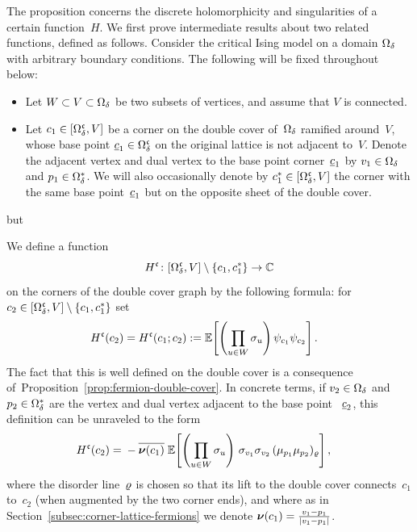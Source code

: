 \documentclass[12pt,oneside,english]{amsart}
\numberwithin{equation}{section}
\numberwithin{figure}{section}
\theoremstyle{plain}
\theoremstyle{plain}
\theoremstyle{plain}
\theoremstyle{plain}
\theoremstyle{remark}
\theoremstyle{definition}
\theoremstyle{plain}
\theoremstyle{plain}
\numberwithin{thm}{section}
\begin{document}
The proposition concerns the discrete holomorphicity and singularities of a 
certain function~$H$. We first prove intermediate results about two 
related functions, defined as follows. Consider the critical Ising model
on a domain ${{\Omega}}_{{\delta}} $ with arbitrary boundary conditions.
The following will be fixed throughout below:
\begin{itemize}
\item Let $W \subset V \subset {{\Omega}}_{{\delta}}$ be two subsets of vertices,
and assume that $V$ is connected.
\item Let $c_1 \in {\left[ {{\Omega}}_{{\delta}}^{\mathfrak{c}}, V \right]}$ be a corner on the double cover 
of~${{\Omega}}_{{\delta}}$ ramified around~$V$, whose base point
$\underline{c}_1 \in {{\Omega}}_{{\delta}}^{\mathfrak{c}}$ on the original lattice is not adjacent 
to~$V$. 
Denote the adjacent vertex and dual vertex to the base 
point corner~$\underline{c}_1$ by
$v_1 \in {{\Omega}}_{{\delta}}$ and $p_1 \in {{\Omega}}_{{\delta}}^*$.
We will also occasionally denote by
$c_1^* \in {\left[ {{\Omega}}_{{\delta}}^{\mathfrak{c}}, V \right]}$ the corner with the same base 
point~$\underline{c}_1$ but on the opposite sheet of the 
double cover.
\end{itemize}
but 

We define a function
\[ H^{\mathfrak{c}} \colon {\left[ {{\Omega}}_{{\delta}}^{\mathfrak{c}}, V \right]} \setminus \left\{ c_1, c_1^* \right\} \to  \mathbb{C} 
\]
on the corners of the double cover graph by the following formula: for
$c_2 \in {\left[ {{\Omega}}_{{\delta}}^{\mathfrak{c}}, V \right]} \setminus \left\{ c_1, c_1^* \right\}$ set
\begin{align}\label{eq: def of H on corners}
H^{\mathfrak{c}} ( c_{2} ) = H^{\mathfrak{c}} ( c_{1} ; c_{2} )
:= \; & \mathbb{E} \! \left[ { \left(
    \prod_{u \in W} {\sigma}_{u} \right)
    {\psi}_{c_{1}} {\psi}_{c_{2}} } \right] .
\end{align}
The fact that this is well defined on the double cover is a consequence 
of~Proposition~\ref{prop:fermion-double-cover}. In concrete terms, if
$v_2 \in {{\Omega}}_{{\delta}}$ and $p_2 \in {{\Omega}}_{{\delta}}^*$ are the vertex and dual vertex 
adjacent to the base point ~$\underline{c}_2$, this definition can be 
unraveled to the form
\begin{align*}
H^{\mathfrak{c}} ( c_{2} ) = \; & - \overline{\boldsymbol{\nu}(c_1)} \; \mathbb{E} \! \left[ { \left(
    \prod_{u \in W} {\sigma}_{u} \right) \, {\sigma}_{v_1} {\sigma}_{v_2} \,
    ({\mu}_{p_1}{\mu}_{p_2})_{{\varrho}}  } \right] ,
\end{align*}
where the disorder line~${\varrho}$ is 
chosen so that its lift to the double cover connects~$c_1$ to~$c_2$
(when augmented by the two corner ends), and where 
as in Section~\ref{subsec:corner-lattice-fermions} we denote
$\boldsymbol{\nu}(c_1) = \frac{v_1-p_1}{|v_1-p_1|}$.
\end{document}
